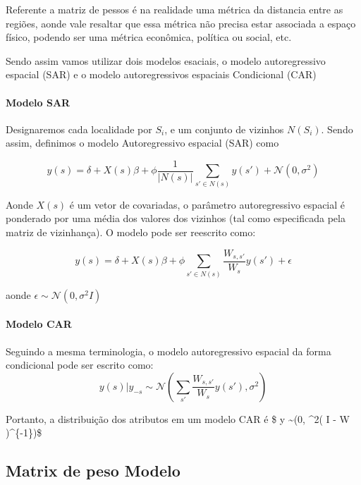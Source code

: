 \documentclass[]{article}
\let\oldparagraph\paragraph
\renewcommand{\paragraph}[1]{\oldparagraph{#1}\mbox{}}
\begin{document}
Referente a matriz de pessos é na realidade uma métrica da distancia
entre as regiões, aonde vale resaltar que essa métrica não precisa estar
associada a espaço físico, podendo ser uma métrica econômica, política
ou social, etc.

Sendo assim vamos utilizar dois modelos esaciais, o modelo
autoregressivo espacial (SAR) e o modelo autoregressivos espaciais
Condicional (CAR)

\paragraph{Modelo SAR}\label{modelo-sar}

Designaremos cada localidade por \(S_i\), e um conjunto de vizinhos
\(N(S_i)\). Sendo assim, definimos o modelo Autoregressivo espacial
(SAR) como

\begin{equation}
  y(s) = \delta + X(s)\beta + \phi \frac{1}{\left| N(s) \right|} \sum_{s' \in N(s)} y(s') + \mathcal{N}(0,\sigma^2)
\end{equation}

Aonde \(X(s)\) é um vetor de covariadas, o parâmetro autoregressivo
espacial é ponderado por uma média dos valores dos vizinhos (tal como
especificada pela matriz de vizinhança). O modelo pode ser reescrito
como:

\begin{equation}
  y(s) = \delta + X(s)\beta + \phi \sum_{s' \in N(s)} \frac{W_{s, s'}}{W_s}  y(s') + \epsilon
\end{equation}

aonde \(\epsilon \sim \mathcal{N}(0,\sigma^2 I)\)

\paragraph{Modelo CAR}\label{modelo-car}

Seguindo a mesma terminologia, o modelo autoregressivo espacial da forma
condicional pode ser escrito como:
\[y(s)|y_{-s} \sim \mathcal{N}\left(\sum_{s'} \frac{W_{s, s'}}{W_s} y(s'), \sigma^2 \right)\]

Portanto, a distribuição dos atributos em um modelo CAR é \$ y
\sim {}\left(0, \sigma\^{}2\left( I - \phi W
\right)\^{}\{-1\}\right)\$

\subsection{Matrix de peso Modelo}\label{matrix-de-peso-modelo}
\end{document}
